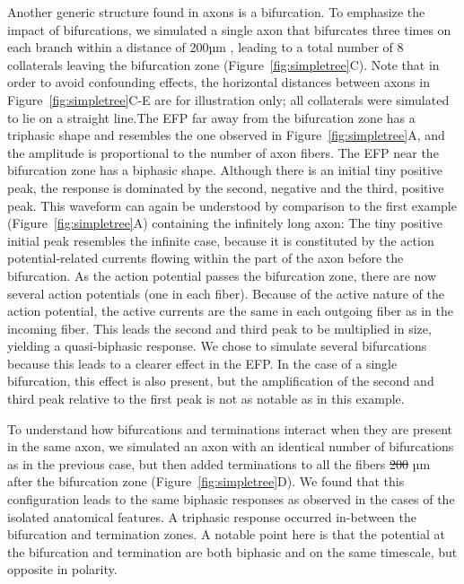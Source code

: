 \documentclass[]{article}
\providecommand{\DIFaddtex}[1]{{\protect\color{blue}\uwave{#1}}} %
\providecommand{\DIFdeltex}[1]{{\protect\color{red}\sout{#1}}}                      %
\providecommand{\DIFaddbegin}{} %
\providecommand{\DIFaddend}{} %
\providecommand{\DIFdelbegin}{} %
\providecommand{\DIFdelend}{} %
\providecommand{\DIFadd}[1]{\texorpdfstring{\DIFaddtex{#1}}{#1}} %
\providecommand{\DIFdel}[1]{\texorpdfstring{\DIFdeltex{#1}}{}} %
\begin{document}
Another generic structure found in axons is a bifurcation. To emphasize
the impact of bifurcations, we simulated a single axon that bifurcates
three times on each branch within a distance of 200\DIFaddbegin \DIFadd{~µm (100~}\DIFaddend µm \DIFaddbegin \DIFadd{between
branchings)}\DIFaddend , leading to a total number of 8 collaterals leaving the
bifurcation zone (Figure~\ref{fig:simpletree}C). \DIFaddbegin \DIFadd{(}\DIFaddend Note that in order to
avoid confounding effects, the horizontal distances between axons in
Figure~\ref{fig:simpletree}C-E are for illustration only; all
collaterals were simulated to lie on a straight line.\DIFaddbegin \DIFadd{) }\DIFaddend The EFP far away
from the bifurcation zone has a triphasic shape and resembles the one
observed in Figure~\ref{fig:simpletree}A, and the amplitude is
proportional to the number of axon fibers. The EFP near the bifurcation
zone has a biphasic shape. Although there is an initial tiny positive
peak, the response is dominated by the second, negative and the third,
positive peak. This waveform can again be understood by comparison to
the first example (Figure~\ref{fig:simpletree}A) containing the
infinitely long axon: The tiny positive initial peak resembles the
infinite case, because it is constituted by the action potential-related
currents flowing within the part of the axon before the bifurcation. As
the action potential passes the bifurcation zone, there are now several
action potentials (one in each fiber). Because of the active nature of
the action potential, the active currents are the same in each outgoing
fiber as in the incoming fiber. This leads the second and third peak to
be multiplied in size, yielding a quasi-biphasic response. We chose to
simulate several bifurcations because this leads to a clearer effect in
the EFP. In the case of a single bifurcation, this effect is also
present, but the amplification of the second and third peak relative to
the first peak is not as notable as in this example.

To understand how bifurcations and terminations interact when they are
present in the same axon, we simulated an axon with an identical number
of bifurcations as in the previous case, but then added terminations to
all the fibers \DIFdelbegin \DIFdel{200 }\DIFdelend \DIFaddbegin \DIFadd{700~}\DIFaddend µm after the bifurcation zone
(Figure~\ref{fig:simpletree}D). We found that this configuration leads
to the same biphasic responses as observed in the cases of the isolated
anatomical features. A triphasic response occurred in-between the
bifurcation and termination zones. A notable point here is that the
potential at the bifurcation and termination are both biphasic and on
the same timescale, but opposite in polarity.
\end{document}
